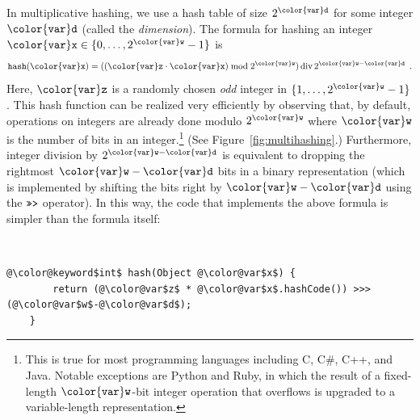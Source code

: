 \documentclass[10pt]{book}
\newcommand{\cpponly}[1]{}\newcommand{\javaonly}[1]{#1}\newcommand{\pcodeonly}[1]{}\newcommand{\notpcode}[1]{#1}\newcommand{\lang}{Java}
\newcommand{\figref}[1]{Figure~\ref{fig:#1}}
\theoremstyle{plain}
\theoremstyle{definition}
\DeclareMathOperator{\ddiv}{div}
\begin{document}
In multiplicative hashing, we use a hash table of size $2^{\ensuremath{\mathtt{{\color{var}d}}}}$ for some
integer \ensuremath{\mathtt{{\color{var}d}}} (called the \emph{dimension}).  The formula for hashing an
integer $\ensuremath{\mathtt{{\color{var}x}}}\in\{0,\ldots,2^{\ensuremath{\mathtt{{\color{var}w}}}}-1\}$ is
\[
    \ensuremath{\mathtt{hash({\color{var}x})}} = ((\ensuremath{\mathtt{{\color{var}z}}}\cdot\ensuremath{\mathtt{{\color{var}x}}}) \bmod 2^{\ensuremath{\mathtt{{\color{var}w}}}}) \ddiv 2^{\ensuremath{\mathtt{{\color{var}w}}}-\ensuremath{\mathtt{{\color{var}d}}}} \enspace .
\]
Here, \ensuremath{\mathtt{{\color{var}z}}} is a randomly chosen \emph{odd} integer in
$\{1,\ldots,2^{\ensuremath{\mathtt{{\color{var}w}}}}-1\}$.  This hash function can be realized very
efficiently by observing that, by default, operations on integers
are already done modulo $2^{\ensuremath{\mathtt{{\color{var}w}}}}$ where $\ensuremath{\mathtt{{\color{var}w}}}$ is the number of bits
in an integer.\footnote{This is true for most programming languages
including C, C\#, C++, and Java. Notable exceptions are Python and
Ruby, in which the result of a fixed-length \ensuremath{\mathtt{{\color{var}w}}}-bit integer operation
that overflows is upgraded to a variable-length representation.}  (See
\figref{multihashing}.) Furthermore, integer division by $2^{\ensuremath{\mathtt{{\color{var}w}}}-\ensuremath{\mathtt{{\color{var}d}}}}$
is equivalent to dropping the rightmost $\ensuremath{\mathtt{{\color{var}w}}}-\ensuremath{\mathtt{{\color{var}d}}}$ bits in a binary
representation (which is implemented by shifting the bits right by
$\ensuremath{\mathtt{{\color{var}w}}}-\ensuremath{\mathtt{{\color{var}d}}}$ using the \javaonly{\ensuremath{\mathtt{\text{\ttfamily >>>}}}}\cpponly{\ensuremath{\mathtt{\text{\ttfamily >>}}}}\pcodeonly{\ensuremath{\mathtt{\text{\ttfamily >>}}}}
operator).  \notpcode{In this way, the code that implements the above
formula is simpler than the formula itself:}


 \ \vspace{.5ex}\begin{Verbatim}[gobble=1,tabsize=2,frame=single,framerule=1.2pt,commandchars=\\@\$,label=\texttt{ChainedHashTable},labelposition=topline]
	@\color@keyword$int$ hash(Object @\color@var$x$) {
		return (@\color@var$z$ * @\color@var$x$.hashCode()) >>> (@\color@var$w$-@\color@var$d$);
	}
\end{Verbatim}
\end{document}
